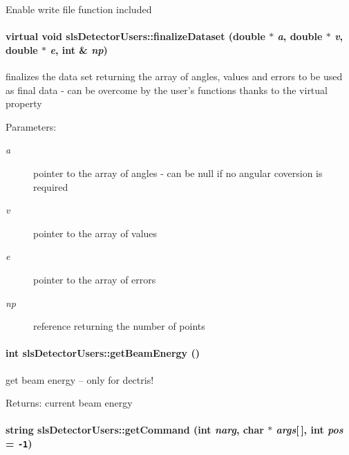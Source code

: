 Enable write file function included \hypertarget{classslsDetectorUsers_9cbe00dac8a19b71de88ebbdf3b0ea29}{
\paragraph[finalizeDataset]{\setlength{\rightskip}{0pt plus 5cm}virtual void sls\-Detector\-Users::finalize\-Dataset (double $\ast$ {\em a}, double $\ast$ {\em v}, double $\ast$ {\em e}, int \& {\em np})}\hfill}
\label{classslsDetectorUsers_9cbe00dac8a19b71de88ebbdf3b0ea29}


finalizes the data set returning the array of angles, values and errors to be used as final data - can be overcome by the user's functions thanks to the virtual property 

\begin{Desc}
\item[Parameters:]
\begin{description}
\item[{\em a}]pointer to the array of angles - can be null if no angular coversion is required \item[{\em v}]pointer to the array of values \item[{\em e}]pointer to the array of errors \item[{\em np}]reference returning the number of points \end{description}
\end{Desc}
\hypertarget{classslsDetectorUsers_c9ea028f75a180534c8d00eeea0727d3}{
\paragraph[getBeamEnergy]{\setlength{\rightskip}{0pt plus 5cm}int sls\-Detector\-Users::get\-Beam\-Energy ()}\hfill}
\label{classslsDetectorUsers_c9ea028f75a180534c8d00eeea0727d3}


get beam energy -- only for dectris! 

\begin{Desc}
\item[Returns:]current beam energy \end{Desc}
\hypertarget{classslsDetectorUsers_dc83b8005abccc735b35464c1c6d3ea7}{
\paragraph[getCommand]{\setlength{\rightskip}{0pt plus 5cm}string sls\-Detector\-Users::get\-Command (int {\em narg}, char $\ast$ {\em args}\mbox{[}$\,$\mbox{]}, int {\em pos} = {\tt -1})}\hfill}
\label{classslsDetectorUsers_dc83b8005abccc735b35464c1c6d3ea7}


